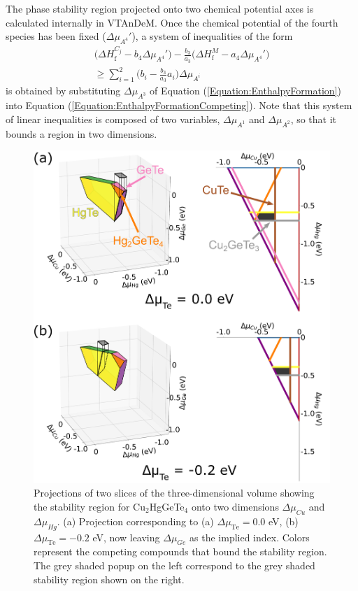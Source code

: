 \documentclass[%
 reprint,
 amsmath,amssymb,
 aps,
]{revtex4-1}
\begin{document}
The phase stability region projected onto two chemical potential axes is calculated internally in VTAnDeM. Once the chemical potential of the fourth species has been fixed ($\Delta \mu_{A^4}'$), a system of inequalities of the form
\begin{equation}
\begin{aligned}
\big( \Delta H^{C_j}_{\text{f}} - b_4 \Delta \mu_{A^4}' \big) - \frac{b_3}{a_3} \big( \Delta H^M_{\text{f}} - a_4 \Delta \mu_{A^4}' \big) \\
\geq \sum_{i=1}^{2} \bigg( b_i - \frac{b_3}{a_3} a_i \bigg) \Delta \mu_{A^i}
\end{aligned}
\label{Equation:EnthalpyFormationProjection}
\end{equation}
is obtained by substituting $\Delta \mu_{A^3}$ of Equation (\ref{Equation:EnthalpyFormation}) into Equation (\ref{Equation:EnthalpyFormationCompeting}). Note that this system of linear inequalities is composed of two variables, $\Delta \mu_{A^1}$ and $\Delta \mu_{A^2}$, so that it bounds a region in two dimensions.

\begin{figure}
    \centering
    \includegraphics[scale=0.15]{ProjectionSchematic_Cu2HgGeTe4_Project_v3.pdf}
    \caption{Projections of two slices of the three-dimensional volume showing the stability region for Cu$_2$HgGeTe$_4$ onto two dimensions $\Delta \mu_{Cu}$ and $\Delta \mu_{Hg}$. (a)  Projection corresponding to (a) $\Delta \mu_{\text{Te}} = 0.0$ eV, (b) $\Delta \mu_{\text{Te}} = -0.2$ eV, now leaving $\Delta \mu_{Ge}$ as the implied index. Colors represent the competing compounds that bound the stability region. The grey shaded popup on the left  correspond to the grey shaded stability region shown on the right.}
    \label{Figure:Projection_Schematic}
\end{figure}
\end{document}
